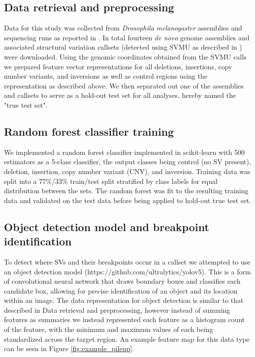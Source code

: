 

\subsection{Data retrieval and preprocessing}
Data for this study was collected from \textit{Drosophila melanogaster} assemblies and sequencing runs as reported in \cite{chakrabortyEvolutionGenomeStructure2021,chakrabortyHiddenGeneticVariation2018,chakrabortyStructuralVariantsExhibit2019}. In total fourteen \textit{de novo} genome assemblies and associated structural variation callsets (detected using SVMU as described in \cite{chakrabortyStructuralVariantsExhibit2019}) were downloaded. Using the genomic coordinates obtained from the SVMU calls we prepared feature vector representations for all deletions, insertions, copy number variants, and inversions as well as control regions using the representation as described above. We then separated out one of the assemblies and callsets to serve as a hold-out test set for all analyses, hereby named the "true test set".

\subsection{Random forest classifier training}

We implemented a random forest classifier \cite{ho1995random} implemented in scikit-learn \cite{scikit-learn} with 500 estimators as a 5-class classifier, the output classes being control (no SV present), deletion, insertion, copy number variant (CNV), and inversion. Training data was split into a 77\%/33\% train/test split stratified by class labels for equal distribution between the sets. The random forest was fit to the resulting training data and validated on the test data before being applied to hold-out true test set.

\subsection{Object detection model and breakpoint identification}

To detect where SVs and their breakpoints occur in a callset we attempted to use an object detection model (https://github.com/ultralytics/yolov5). This is a form of convolutional neural network that draws boundary boxes and classifies each candidate box, allowing for precise identification of an object and its location within an image. The data representation for object detection is similar to that described in Data retrieval and preprocessing, however instead of summing features as summaries we instead represented each feature as a histogram count of the feature, with the minimum and maximum values of each being standardized across the target region. An example feature map for this data type can be seen in Figure \ref{fig:example_pileup}. 

